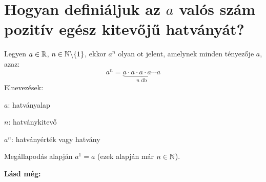 
\section{Hogyan definiáljuk az \texorpdfstring{$a$}{a} valós szám pozitív egész
kitevőjű hatványát?}

\begin{defin}[Hatvány]
\label{def:power}
Legyen $a \in \mathbb{R}$, $n \in \mathbb{N} \backslash \{1\}$, ekkor $a^n$ olyan
ot jelent, amelynek minden tényezője $a$, azaz:
\[
a^n = \underbrace{a \cdot a \cdot a \cdot a \cdots{ } a}_{n \text{ db}}
\]
Elnevezések:

$a$: hatványalap

$n$: hatványkitevő

$a^n$: hatványérték vagy hatvány

Megállapodás alapján $a^1 = a$ (ezek alapján már $n \in \mathbb{N}$).
\end{defin}

\textbf{Lásd még:}

